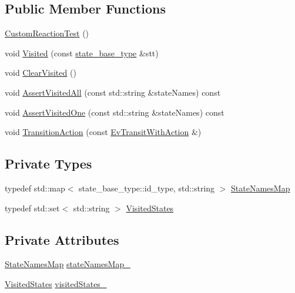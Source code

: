 \subsection*{Public Member Functions}
\begin{DoxyCompactItemize}
\item 
\mbox{\hyperlink{struct_custom_reaction_test_a3edaf9d7a2d27269ecfc4a37d4e7a072}{Custom\+Reaction\+Test}} ()
\item 
void \mbox{\hyperlink{struct_custom_reaction_test_ae8d89bbec1c549a54af1980e282367a9}{Visited}} (const \mbox{\hyperlink{classboost_1_1statechart_1_1state__machine_a69cc258c29fcabec25c5dc8bedb7d530}{state\+\_\+base\+\_\+type}} \&stt)
\item 
void \mbox{\hyperlink{struct_custom_reaction_test_a709bb7b5b76023d92a3438eca445d37b}{Clear\+Visited}} ()
\item 
void \mbox{\hyperlink{struct_custom_reaction_test_a0f75c5c035c97fa960064afa6656ae06}{Assert\+Visited\+All}} (const std\+::string \&state\+Names) const
\item 
void \mbox{\hyperlink{struct_custom_reaction_test_aab84126951398a6b976417dc01ceacb0}{Assert\+Visited\+One}} (const std\+::string \&state\+Names) const
\item 
void \mbox{\hyperlink{struct_custom_reaction_test_ac5e80e655da98aec51957072fa2d74bc}{Transition\+Action}} (const \mbox{\hyperlink{struct_ev_transit_with_action}{Ev\+Transit\+With\+Action}} \&)
\end{DoxyCompactItemize}
\subsection*{Private Types}
\begin{DoxyCompactItemize}
\item 
typedef std\+::map$<$ state\+\_\+base\+\_\+type\+::id\+\_\+type, std\+::string $>$ \mbox{\hyperlink{struct_custom_reaction_test_a0910113d8f9548d106ad7bf63a3fa136}{State\+Names\+Map}}
\item 
typedef std\+::set$<$ std\+::string $>$ \mbox{\hyperlink{struct_custom_reaction_test_aeb9e297d55868cf2eeca6f76f049fa1a}{Visited\+States}}
\end{DoxyCompactItemize}
\subsection*{Private Attributes}
\begin{DoxyCompactItemize}
\item 
\mbox{\hyperlink{struct_custom_reaction_test_a0910113d8f9548d106ad7bf63a3fa136}{State\+Names\+Map}} \mbox{\hyperlink{struct_custom_reaction_test_a1d740df93c873477361c2951b768aa84}{state\+Names\+Map\+\_\+}}
\item 
\mbox{\hyperlink{struct_custom_reaction_test_aeb9e297d55868cf2eeca6f76f049fa1a}{Visited\+States}} \mbox{\hyperlink{struct_custom_reaction_test_ac7fc5badec18ca81d108fe608fab7cc9}{visited\+States\+\_\+}}
\end{DoxyCompactItemize}
